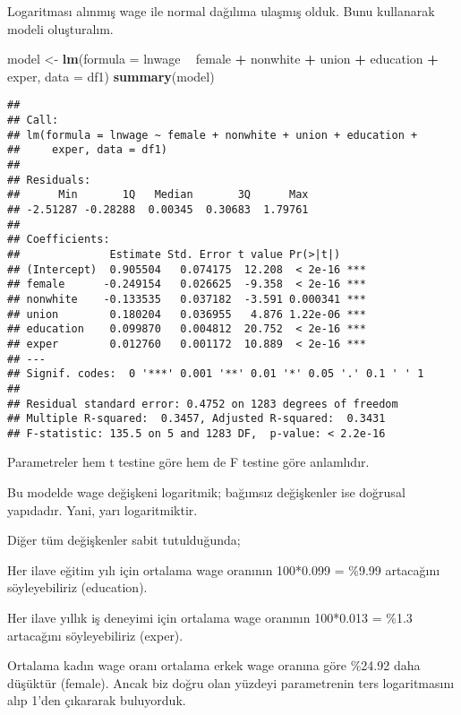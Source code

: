 \documentclass[
]{book}
\newenvironment{Shaded}{\begin{snugshade}}{\end{snugshade}}
\newcommand{\DataTypeTok}[1]{\textcolor[rgb]{0.13,0.29,0.53}{#1}}
\newcommand{\KeywordTok}[1]{\textcolor[rgb]{0.13,0.29,0.53}{\textbf{#1}}}
\newcommand{\NormalTok}[1]{#1}
\newcommand{\OperatorTok}[1]{\textcolor[rgb]{0.81,0.36,0.00}{\textbf{#1}}}
\newcommand{\StringTok}[1]{\textcolor[rgb]{0.31,0.60,0.02}{#1}}
\begin{document}
Logaritması alınmış wage ile normal dağılıma ulaşmış olduk. Bunu kullanarak modeli oluşturalım.

\begin{Shaded}
\begin{Highlighting}[]
\NormalTok{model <-}\StringTok{ }\KeywordTok{lm}\NormalTok{(}\DataTypeTok{formula =}\NormalTok{ lnwage }\OperatorTok{~}\StringTok{ }\NormalTok{female }\OperatorTok{+}\StringTok{ }\NormalTok{nonwhite }\OperatorTok{+}\StringTok{ }\NormalTok{union }\OperatorTok{+}\StringTok{ }\NormalTok{education }\OperatorTok{+}\StringTok{ }\NormalTok{exper, }\DataTypeTok{data =}\NormalTok{ df1)}
\KeywordTok{summary}\NormalTok{(model)}
\end{Highlighting}
\end{Shaded}

\begin{verbatim}
## 
## Call:
## lm(formula = lnwage ~ female + nonwhite + union + education + 
##     exper, data = df1)
## 
## Residuals:
##      Min       1Q   Median       3Q      Max 
## -2.51287 -0.28288  0.00345  0.30683  1.79761 
## 
## Coefficients:
##              Estimate Std. Error t value Pr(>|t|)    
## (Intercept)  0.905504   0.074175  12.208  < 2e-16 ***
## female      -0.249154   0.026625  -9.358  < 2e-16 ***
## nonwhite    -0.133535   0.037182  -3.591 0.000341 ***
## union        0.180204   0.036955   4.876 1.22e-06 ***
## education    0.099870   0.004812  20.752  < 2e-16 ***
## exper        0.012760   0.001172  10.889  < 2e-16 ***
## ---
## Signif. codes:  0 '***' 0.001 '**' 0.01 '*' 0.05 '.' 0.1 ' ' 1
## 
## Residual standard error: 0.4752 on 1283 degrees of freedom
## Multiple R-squared:  0.3457, Adjusted R-squared:  0.3431 
## F-statistic: 135.5 on 5 and 1283 DF,  p-value: < 2.2e-16
\end{verbatim}

Parametreler hem t testine göre hem de F testine göre anlamlıdır.

Bu modelde wage değişkeni logaritmik; bağımsız değişkenler ise doğrusal yapıdadır. Yani, yarı logaritmiktir.

Diğer tüm değişkenler sabit tutulduğunda;

Her ilave eğitim yılı için ortalama wage oranının 100*0.099 = \%9.99 artacağını söyleyebiliriz (education).

Her ilave yıllık iş deneyimi için ortalama wage oranının 100*0.013 = \%1.3 artacağını söyleyebiliriz (exper).

Ortalama kadın wage oranı ortalama erkek wage oranına göre \%24.92 daha düşüktür (female). Ancak biz doğru olan yüzdeyi parametrenin ters logaritmasını alıp 1'den çıkararak buluyorduk.
\end{document}
